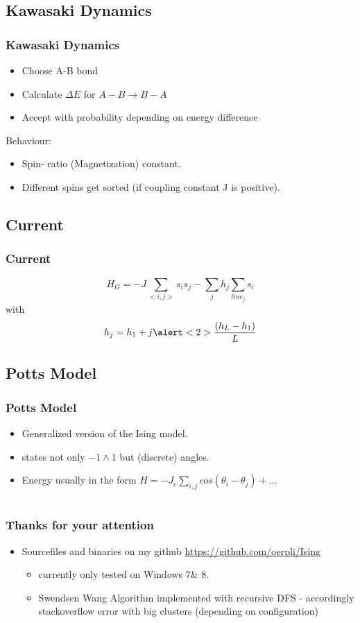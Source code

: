 \documentclass{beamer}
\begin{document}
\subsection{Kawasaki Dynamics}
\begin{frame}
\frametitle{Kawasaki Dynamics}
\begin{itemize}
\item Choose A-B bond
\item Calculate $\Delta E$ for $A-B \rightarrow B-A$
\item Accept with probability depending on energy difference
\end{itemize}
Behaviour:
\begin{itemize}
\item Spin- ratio (Magnetization) constant.
\item Different spins get sorted (if coupling constant J is positive).
\end{itemize}
\end{frame}

\subsection{Current}
\begin{frame}
\frametitle{Current}
\[H_G = -J\sum_{<i,j>}s_is_j - \sum_jh_j\sum_{line_j} s_i\]
with
\[h_j = h_1 + j\alert<2>{\frac{(h_L-h_1)}{L}}\]
\end{frame}

\subsection{Potts Model}
\begin{frame}
\frametitle{Potts Model}
\begin{itemize}
\item Generalized version of the Ising model.
\item states not only $-1 \land 1$ but (discrete) angles.
\item Energy usually in the form $H = -J_c \sum_{i,j}cos\left(\theta_i -\theta_j\right) +  \ldots$
\end{itemize}
\end{frame}
\section*{}

\begin{frame}
\frametitle{Thanks for your attention}
\begin{itemize}
\item Sourcefiles and binaries on my github \href{https://github.com/oerpli/Ising}{https://github.com/oerpli/Ising}
\begin{itemize}
\item currently only tested on Windows 7\& 8.
\item Swendsen Wang Algorithm implemented with recursive DFS - accordingly stackoverflow error with big clusters (depending on configuration)
\end{itemize}
\end{itemize}
\end{frame}
\end{document}
